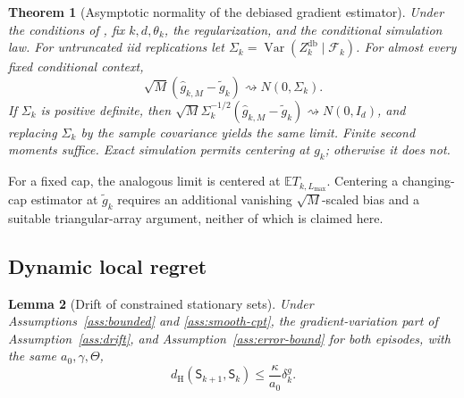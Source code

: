 \documentclass[11pt]{article}
\newtheorem{theorem}{Theorem}[section]
\newtheorem{lemma}[theorem]{Lemma}
\newcommand{\E}{\mathbb E}
\newcommand{\Var}{\operatorname{Var}}
\newcommand{\1}{\mathbf 1}
\newcommand{\cF}{\mathcal F}
\newcommand{\Sta}{\mathsf S}
\newcommand{\dH}{d_{\mathrm H}}
\newcommand{\db}{\mathrm{db}}
\begin{document}
\begin{theorem}[Asymptotic normality of the debiased gradient estimator]\label{thm:clt}
Under the conditions of , fix $k,d,\theta_k$, the regularization, and the conditional simulation law. For untruncated iid replications let $\Sigma_k=\Var(Z_k^{\db}\mid\cF_k)$. For almost every fixed conditional context,
\begin{equation}\label{eq:clt}
 \sqrt M(\widehat g_{k,M}-\widetilde g_k)
 \rightsquigarrow N(0,\Sigma_k).
\end{equation}
If $\Sigma_k$ is positive definite, then
$\sqrt M\Sigma_k^{-1/2}(\widehat g_{k,M}-\widetilde g_k)\rightsquigarrow N(0,I_d)$,
and replacing $\Sigma_k$ by the sample covariance yields the same limit. Finite second moments suffice. Exact simulation permits centering at $g_k$; otherwise it does not.
\end{theorem}
For a fixed cap, the analogous limit is centered at $\E T_{k,L_{\max}}$. Centering a changing-cap estimator at $\widetilde g_k$ requires an additional vanishing $\sqrt M$-scaled bias and a suitable triangular-array argument, neither of which is claimed here.

\subsection{Dynamic local regret}
\begin{lemma}[Drift of constrained stationary sets]\label{lem:set-drift}
Under Assumptions~\ref{ass:bounded} and \ref{ass:smooth-cpt}, the gradient-variation part of Assumption~\ref{ass:drift}, and Assumption~\ref{ass:error-bound} for both episodes, with the same $a_0,\gamma,\Theta$,
\begin{equation}\label{eq:set-drift}
 \dH(\Sta_{k+1},\Sta_k)\le\frac{\kappa}{a_0}\delta_k^{g}.
\end{equation}
\end{lemma}
\end{document}
